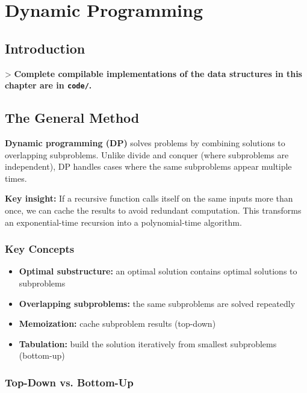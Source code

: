 \chapter{Dynamic Programming}\label{ch17:dynamic-programming}

\section{Introduction}

> \textbf{Complete compilable implementations of the data structures in this chapter are in \texttt{code/}.}

\section{The General Method}

\textbf{Dynamic programming (DP)} solves problems by combining solutions to overlapping subproblems. Unlike divide and conquer (where subproblems are independent), DP handles cases where the same subproblems appear multiple times.

\textbf{Key insight:} If a recursive function calls itself on the same inputs more than once, we can cache the results to avoid redundant computation. This transforms an exponential-time recursion into a polynomial-time algorithm.

\subsection{Key Concepts}

\begin{itemize}
\item \textbf{Optimal substructure:} an optimal solution contains optimal solutions to subproblems
\item \textbf{Overlapping subproblems:} the same subproblems are solved repeatedly
\item \textbf{Memoization:} cache subproblem results (top-down)
\item \textbf{Tabulation:} build the solution iteratively from smallest subproblems (bottom-up)
\end{itemize}

\subsection{Top-Down vs. Bottom-Up}

